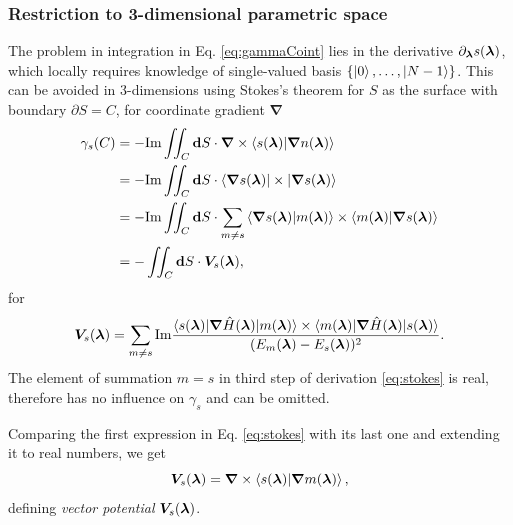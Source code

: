\subsubsection{Restriction to 3-dimensional parametric space}
The problem in integration in Eq. \ref{eq:gammaCoint} lies in the derivative $\partial_{\bm\lambda} s({\bm\lambda})$, which locally requires knowledge of single-valued basis $\{\ket{0},\dots, \ket{N-1}\}$. This can be avoided in 3-dimensions using Stokes's theorem for $S$ as the surface with boundary $\partial S=C$, for coordinate gradient $\bm \nabla$
\begin{equation}
    \begin{split}
        \gamma_s(C) &= -\textrm{Im} \iint_C \bm{\mathrm{d}} S \cdot \bm \nabla \times \braket{s({\bm\lambda})|\bm \nabla n({\bm\lambda})}\\
         &= -\textrm{Im} \iint_C \bm{\mathrm{d}} S \cdot \braket{\bm \nabla s({\bm\lambda})|\times|\bm \nabla s({\bm\lambda})}\\
        &= -\textrm{Im} \iint_C \bm{\mathrm{d}} S \cdot \sum_{m\neq s} \braket{\bm \nabla s({\bm\lambda})|m({\bm\lambda})}\times \braket{m({\bm\lambda})|\bm \nabla s({\bm\lambda})}\\
        &= -\iint_C \bm{\mathrm{d}} S \cdot \bm V_s({\bm\lambda}),
    \end{split}
    \label{eq:stokes}
\end{equation}
for 
\begin{equation}
    \bm V_s({\bm\lambda}) = \sum_{m\neq s} \textrm{Im} \frac{
            \braket{s({\bm\lambda})|\bm \nabla\hat{H}({\bm\lambda}) |m({\bm\lambda})}\times \braket{m({\bm\lambda})|\bm \nabla\hat{H}({\bm\lambda})|s({\bm\lambda})}    
             }{
(E_m({\bm\lambda})-E_s({\bm\lambda}))^2
             }.
\end{equation}
The element of summation $m=s$ in third step of derivation \ref{eq:stokes} is real, therefore has no influence on $\gamma_s$ and can be omitted. 

Comparing the first expression in Eq. \ref{eq:stokes} with its last one and extending it to real numbers, we get
\begin{equation}
    \bm V_s({\bm\lambda})=\bm \nabla\times\braket{s({\bm\lambda})|\bm \nabla m({\bm\lambda})}, 
    \label{eq:vectorPotentialDef}  
\end{equation}
defining \emph{vector potential} $\bm V_s({\bm\lambda})$.

